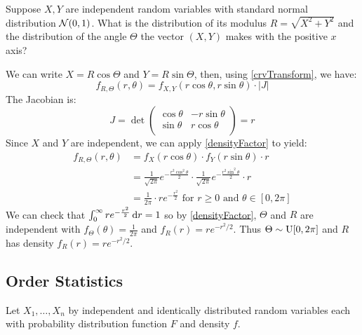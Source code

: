\documentclass[../main.tex]{subfiles}
\begin{document}
\begin{example} \label{boxMullerExample}
  Suppose $X, Y$ are independent random variables with standard normal distribution $\operatorname{\mathcal{N}}(0, 1)$.
  What is the distribution of its modulus $R = \sqrt{X^2 + Y^2}$ and the distribution of the angle $\Theta$ the vector $(X, Y)$ makes with the positive $x$ axis?

  We can write $X = R \cos \Theta$ and $Y = R \sin \Theta$, then, using \cref{crvTransform}, we have:
  \[
    f_{R, \Theta}(r, \theta) = f_{X, Y}(r \cos \theta, r \sin \theta) \cdot |J|
  \]
  The Jacobian is:
  \[
    J = \det \begin{pmatrix}
    \cos \theta & -r \sin \theta \\
    \sin \theta & r \cos \theta \\
    \end{pmatrix} = r
  \]
  Since $X$ and $Y$ are independent, we can apply \cref{densityFactor} to yield:
  \begin{align*}
    f_{R, \Theta}(r, \theta) &= f_{X}(r \cos \theta) \cdot f_{Y}(r \sin \theta) \cdot r \\
                             &= \frac{1}{\sqrt{2\pi}}e^{-\frac{r^2 \cos^2 \theta}{2}} \cdot \frac{1}{\sqrt{2\pi}}e^{-\frac{r^2 \sin^2 \theta}{2}} \cdot r \\
                             &= \frac{1}{2\pi} \cdot re^{-\frac{r^2}{2}} \text{ for $r \geq 0$ and $\theta \in [0, 2\pi]$}
  \end{align*}
  We can check that $\int_{0}^{\infty} re^{-\frac{r^2}{2}} \d{r} = 1$ so by \cref{densityFactor}, $\Theta$ and $R$ are independent with $f_{\Theta}(\theta) = \frac{1}{2\pi}$ and $f_R(r) = re^{-r^2/2}$.
  Thus $\Theta \sim \operatorname{U}[0, 2\pi]$ and $R$ has density $f_R(r) = re^{-r^2/2}$.
\end{example}
\subsection{Order Statistics}
Let $X_1, \ldots, X_n$ by independent and identically distributed random variables each with probability distribution function $F$ and density $f$.
\end{document}
